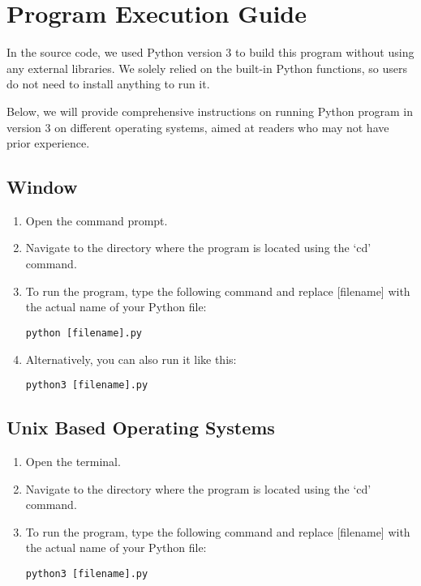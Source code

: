 \section{Program Execution Guide}

\qquad In the source code, we used Python version 3 to build this program without using any external libraries. We solely relied on the built-in Python functions, so users do not need to install anything to run it.

\qquad Below, we will provide comprehensive instructions on running Python program in version 3 on different operating systems, aimed at readers who may not have prior experience.

\subsection{Window}

\begin{enumerate}[itemsep=3pt, parsep=2pt, topsep=2pt, leftmargin=1.5cm]
    \item Open the command prompt.
    \item Navigate to the directory where the program is located using the `cd' command.
    \item To run the program, type the following command and replace [filename] with the actual name of your Python file:
\begin{lstlisting}[style=terminal]
  python [filename].py
\end{lstlisting}
    \item Alternatively, you can also run it like this:
\begin{lstlisting}[style=terminal]
  python3 [filename].py
\end{lstlisting}
\end{enumerate}

\subsection{Unix Based Operating Systems}

\begin{enumerate}[itemsep=3pt, parsep=2pt, topsep=2pt, leftmargin=1.5cm]
    \item Open the terminal.
    \item Navigate to the directory where the program is located using the `cd' command.
    \item To run the program, type the following command and replace [filename] with the actual name of your Python file:
\begin{lstlisting}[style=terminal]
  python3 [filename].py
\end{lstlisting}
\end{enumerate}

\pagebreak